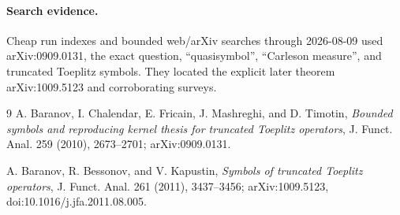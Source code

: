 \documentclass[11pt]{article}
\begin{document}
\paragraph{Search evidence.}
Cheap run indexes and bounded web/arXiv searches through 2026-08-09 used
arXiv:0909.0131, the exact question, ``quasisymbol'', ``Carleson measure'',
and truncated Toeplitz symbols.  They located the explicit later theorem
arXiv:1009.5123 and corroborating surveys.

\begin{thebibliography}{9}
A. Baranov, I. Chalendar, E. Fricain, J. Mashreghi, and D. Timotin,
\emph{Bounded symbols and reproducing kernel thesis for truncated Toeplitz
operators}, J. Funct. Anal. 259 (2010), 2673--2701;
arXiv:0909.0131.

A. Baranov, R. Bessonov, and V. Kapustin,
\emph{Symbols of truncated Toeplitz operators},
J. Funct. Anal. 261 (2011), 3437--3456;
arXiv:1009.5123, doi:10.1016/j.jfa.2011.08.005.
\end{thebibliography}
\end{document}
